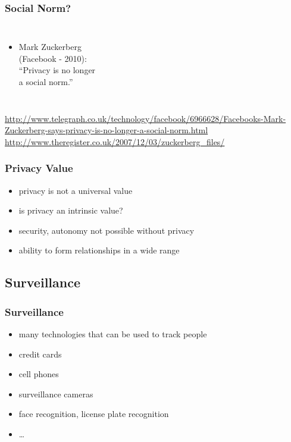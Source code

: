 \documentclass[dvipsnames]{beamer}
\theoremstyle{plain}
\begin{document}
\begin{frame}
  \frametitle{Social Norm?}

  \begin{columns}

    \begin{itemize}
      \item Mark Zuckerberg\\
        (Facebook - 2010):\\
        \smallskip
        ``Privacy is no longer\\
          a social norm.''
    \end{itemize}
  \end{columns}

  \medskip
  \tiny{\url{http://www.telegraph.co.uk/technology/facebook/6966628/Facebooks-Mark-Zuckerberg-says-privacy-is-no-longer-a-social-norm.html}}\\
  \smallskip
  \tiny{\url{http://www.theregister.co.uk/2007/12/03/zuckerberg_files/}}\\
\end{frame}


\begin{frame}
  \frametitle{Privacy Value}

  \begin{itemize}
    \item privacy is not a universal value

    \pause
    \bigskip
    \item is privacy an intrinsic value?
    \smallskip
    \item security, autonomy not possible without privacy
    \item ability to form relationships in a wide range
  \end{itemize}
\end{frame}

\subsection{Surveillance}

\begin{frame}
  \frametitle{Surveillance}

  \begin{itemize}
    \item many technologies that can be used to track people

    \medskip
    \item credit cards
    \item cell phones
    \item surveillance cameras
    \item face recognition, license plate recognition
    \item \ldots
  \end{itemize}
\end{frame}
\end{document}
